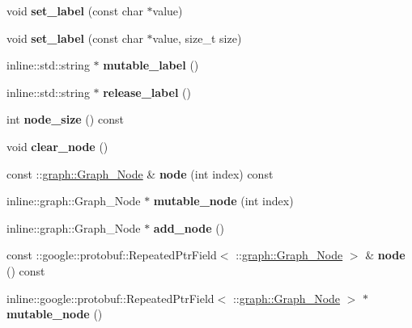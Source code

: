 \begin{DoxyCompactItemize}
\item 
\hypertarget{classgraph_1_1Graph_a2e33bd3438f862850c7f2fad8bb3e544}{
void {\bfseries set\_\-label} (const char $\ast$value)}
\label{classgraph_1_1Graph_a2e33bd3438f862850c7f2fad8bb3e544}

\item 
\hypertarget{classgraph_1_1Graph_a829bbd790ed76b6b1729d4c719b413d7}{
void {\bfseries set\_\-label} (const char $\ast$value, size\_\-t size)}
\label{classgraph_1_1Graph_a829bbd790ed76b6b1729d4c719b413d7}

\item 
\hypertarget{classgraph_1_1Graph_abcd3b4981aab3985879a10d16e296cfc}{
inline::std::string $\ast$ {\bfseries mutable\_\-label} ()}
\label{classgraph_1_1Graph_abcd3b4981aab3985879a10d16e296cfc}

\item 
\hypertarget{classgraph_1_1Graph_a95eb83261e9a9f59cb20b6b850c3561c}{
inline::std::string $\ast$ {\bfseries release\_\-label} ()}
\label{classgraph_1_1Graph_a95eb83261e9a9f59cb20b6b850c3561c}

\item 
\hypertarget{classgraph_1_1Graph_a005baadb25b7b9611082a1c3f285cdfa}{
int {\bfseries node\_\-size} () const }
\label{classgraph_1_1Graph_a005baadb25b7b9611082a1c3f285cdfa}

\item 
\hypertarget{classgraph_1_1Graph_ad4899b84d05fc768fa335047725eaf24}{
void {\bfseries clear\_\-node} ()}
\label{classgraph_1_1Graph_ad4899b84d05fc768fa335047725eaf24}

\item 
\hypertarget{classgraph_1_1Graph_a0d740c76c632f0670da81e6b4535d169}{
const ::\hyperlink{classgraph_1_1Graph__Node}{graph::Graph\_\-Node} \& {\bfseries node} (int index) const }
\label{classgraph_1_1Graph_a0d740c76c632f0670da81e6b4535d169}

\item 
\hypertarget{classgraph_1_1Graph_aeae06c451a4508a381f20a80322ea341}{
inline::graph::Graph\_\-Node $\ast$ {\bfseries mutable\_\-node} (int index)}
\label{classgraph_1_1Graph_aeae06c451a4508a381f20a80322ea341}

\item 
\hypertarget{classgraph_1_1Graph_a3c2452c8ed3a663cbfb9bd76acb67dc1}{
inline::graph::Graph\_\-Node $\ast$ {\bfseries add\_\-node} ()}
\label{classgraph_1_1Graph_a3c2452c8ed3a663cbfb9bd76acb67dc1}

\item 
\hypertarget{classgraph_1_1Graph_a603d1f721a181ae75db8e79e42aa86e0}{
const ::google::protobuf::RepeatedPtrField$<$ ::\hyperlink{classgraph_1_1Graph__Node}{graph::Graph\_\-Node} $>$ \& {\bfseries node} () const }
\label{classgraph_1_1Graph_a603d1f721a181ae75db8e79e42aa86e0}

\item 
\hypertarget{classgraph_1_1Graph_a54b5cfd7fe26ff67c3d8da6acd69e9b7}{
inline::google::protobuf::RepeatedPtrField$<$ ::\hyperlink{classgraph_1_1Graph__Node}{graph::Graph\_\-Node} $>$ $\ast$ {\bfseries mutable\_\-node} ()}
\label{classgraph_1_1Graph_a54b5cfd7fe26ff67c3d8da6acd69e9b7}

\end{DoxyCompactItemize}
